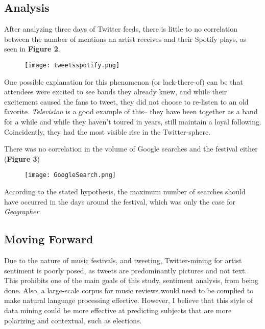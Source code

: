 \documentclass{article}
\begin{document}
\subsection{Analysis}
After analyzing three days of Twitter feeds, there is little to no correlation between the number of mentions an artist receives and their Spotify plays, as seen in {\bf Figure 2}.

\begin{figure}[!ht]
\begin{center}
\texttt{[image: tweetsspotify.png]}
\end{center}
\end{figure}

One possible explanation for this phenomenon (or lack-there-of) can be that attendees were excited to see bands they already knew, and while their excitement caused the fans to tweet, they did not choose to re-listen to an old favorite. {\emph{Television}} is a good example of this-- they have been together as a band for a while and while they haven't toured in years, still maintain a loyal following. Coincidently, they had the most visible rise in the Twitter-sphere. \*

There was no correlation in the volume of Google searches and the festival either ({\bf Figure 3})

\begin{figure}[!ht]
\begin{center}
\texttt{[image: GoogleSearch.png]}
\end{center}
\end{figure}

According to the stated hypothesis, the maximum number of searches should have occurred in the days around the festival, which was only the case for \emph{Geographer}. 

\subsection{Moving Forward}
Due to the nature of music festivals, and tweeting, Twitter-mining for artist sentiment is poorly posed, as tweets are predominantly pictures and not text. This prohibits one of the main goals of this study, sentiment analysis, from being done. Also, a large-scale corpus for music reviews would need to be complied to make natural language processing effective. However, I believe that this style of data mining could be more effective at predicting subjects that are more polarizing and contextual, such as elections. \*
\end{document}

